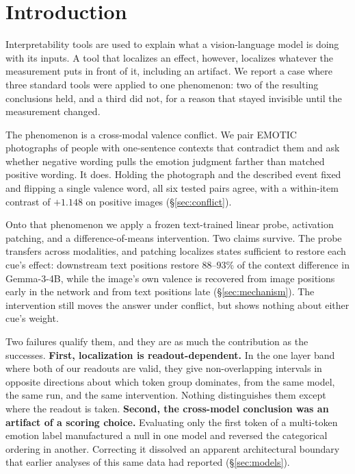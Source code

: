 \documentclass{article}
\newif\ifshort
\newcommand{\gemma}{Gemma-3-4B}
\begin{document}
\ifshort
\section{Introduction}
\label{sec:intro}

Interpretability tools are used to explain what a vision-language model is doing with its inputs. A tool that localizes an effect, however, localizes whatever the measurement puts in front of it, including an artifact. We report a case where three standard tools were applied to one phenomenon: two of the resulting conclusions held, and a third did not, for a reason that stayed invisible until the measurement changed.

The phenomenon is a cross-modal valence conflict. We pair EMOTIC photographs of people \citep{kosti2019} with one-sentence contexts that contradict them and ask whether negative wording pulls the emotion judgment farther than matched positive wording. It does. Holding the photograph and the described event fixed and flipping a single valence word, all six tested pairs agree, with a within-item contrast of $+1.148$ on positive images (\S\ref{sec:conflict}).

Onto that phenomenon we apply a frozen text-trained linear probe, activation patching, and a difference-of-means intervention. Two claims survive. The probe transfers across modalities, and patching localizes states sufficient to restore each cue's effect: downstream text positions restore $88$--$93\%$ of the context difference in \gemma{}, while the image's own valence is recovered from image positions early in the network and from text positions late (\S\ref{sec:mechanism}). The intervention still moves the answer under conflict, but shows nothing about either cue's weight.

Two failures qualify them, and they are as much the contribution as the successes. \textbf{First, localization is readout-dependent.} In the one layer band where both of our readouts are valid, they give non-overlapping intervals in opposite directions about which token group dominates, from the same model, the same run, and the same intervention. Nothing distinguishes them except where the readout is taken. \textbf{Second, the cross-model conclusion was an artifact of a scoring choice.} Evaluating only the first token of a multi-token emotion label manufactured a null in one model and reversed the categorical ordering in another. Correcting it dissolved an apparent architectural boundary that earlier analyses of this same data had reported (\S\ref{sec:models}).
\end{document}
